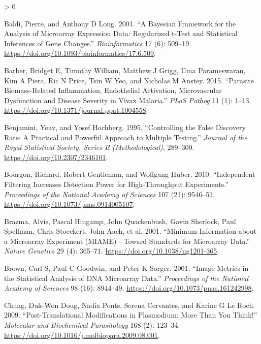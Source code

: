 \documentclass[
  a4paper]{article}
\newlength{\cslhangindent}
\newenvironment{CSLReferences}[2] %
 {%
  \setlength{\parindent}{0pt}
  \ifodd #1 \everypar{\setlength{\hangindent}{\cslhangindent}}\ignorespaces\fi
  \ifnum #2 > 0
  \setlength{\parskip}{#2\baselineskip}
  \fi
 }%
 {}
\begin{document}
\begin{CSLReferences}{1}{0}
\leavevmode\hypertarget{ref-baldi2001cybert}{}%
Baldi, Pierre, and Anthony D Long. 2001. {``A Bayesian Framework for the
Analysis of Microarray Expression Data: Regularized t-Test and
Statistical Inferences of Gene Changes.''} \emph{Bioinformatics} 17 (6):
509--19. \url{https://doi.org/10.1093/bioinformatics/17.6.509}.

\leavevmode\hypertarget{ref-barber2015}{}%
Barber, Bridget E, Timothy William, Matthew J Grigg, Uma Parameswaran,
Kim A Piera, Ric N Price, Tsin W Yeo, and Nicholas M Anstey. 2015.
{``Parasite Biomass-Related Inflammation, Endothelial Activation,
Microvascular Dysfunction and Disease Severity in Vivax Malaria.''}
\emph{PLoS Pathog} 11 (1): 1--13.
\url{https://doi.org/10.1371/journal.ppat.1004558}.

\leavevmode\hypertarget{ref-benjamini1995fdr}{}%
Benjamini, Yoav, and Yosef Hochberg. 1995. {``Controlling the False
Discovery Rate: A Practical and Powerful Approach to Multiple
Testing.''} \emph{Journal of the Royal Statistical Society. Series B
(Methodological)}, 289--300. \url{https://doi.org/10.2307/2346101}.

\leavevmode\hypertarget{ref-bourgon2010filter}{}%
Bourgon, Richard, Robert Gentleman, and Wolfgang Huber. 2010.
{``Independent Filtering Increases Detection Power for High-Throughput
Experiments.''} \emph{Proceedings of the National Academy of Sciences}
107 (21): 9546--51. \url{https://doi.org/10.1073/pnas.0914005107}.

\leavevmode\hypertarget{ref-brazma2001}{}%
Brazma, Alvis, Pascal Hingamp, John Quackenbush, Gavin Sherlock, Paul
Spellman, Chris Stoeckert, John Aach, et al. 2001. {``Minimum
Information about a Microarray Experiment ({MIAME})---Toward Standards
for Microarray Data.''} \emph{Nature Genetics} 29 (4): 365--71.
\url{https://doi.org/10.1038/ng1201-365}.

\leavevmode\hypertarget{ref-brown2001image}{}%
Brown, Carl S, Paul C Goodwin, and Peter K Sorger. 2001. {``Image
Metrics in the Statistical Analysis of DNA Microarray Data.''}
\emph{Proceedings of the National Academy of Sciences} 98 (16):
8944--49. \url{https://doi.org/10.1073/pnas.161242998}.

\leavevmode\hypertarget{ref-leroch2009postmod}{}%
Chung, Duk-Won Doug, Nadia Ponts, Serena Cervantes, and Karine G Le
Roch. 2009. {``Post-Translational Modifications in Plasmodium: More Than
You Think!''} \emph{Molecular and Biochemical Parasitology} 168 (2):
123--34. \url{https://doi.org/10.1016/j.molbiopara.2009.08.001}.


\end{CSLReferences}
\end{document}
